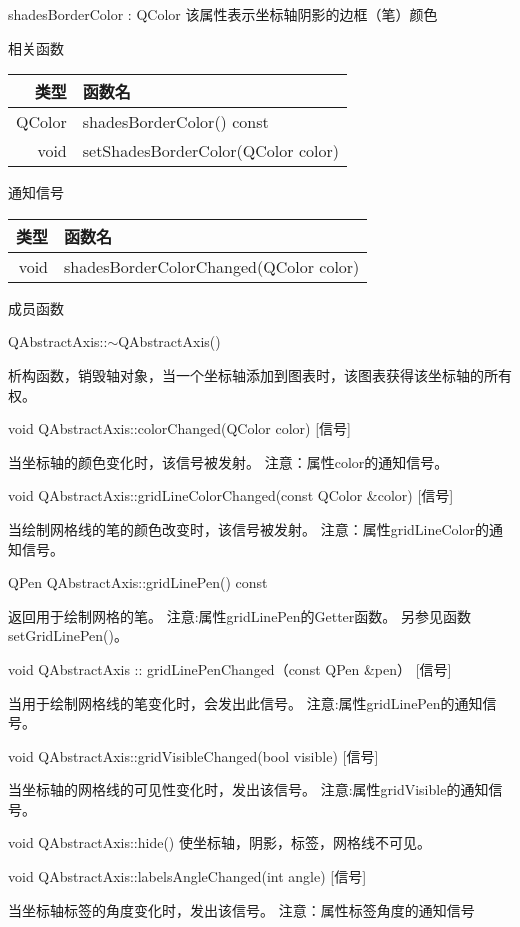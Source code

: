 shadesBorderColor : QColor 该属性表示坐标轴阴影的边框（笔）颜色

相关函数

\begin{tabular}{|r|l|}
\hline
类型&函数名\\ 
\hline
QColor	&shadesBorderColor() const\\
\hline
void&	setShadesBorderColor(QColor color)\\
\hline
\end{tabular}

通知信号

\begin{tabular}{|r|l|}
\hline
类型&函数名\\ 
\hline
void& shadesBorderColorChanged(QColor color)\\
\hline
\end{tabular}

\splitLine

成员函数

QAbstractAxis::$\sim$QAbstractAxis() 

析构函数，销毁轴对象，当一个坐标轴添加到图表时，该图表获得该坐标轴的所有权。

void QAbstractAxis::colorChanged(QColor color) [信号] 

当坐标轴的颜色变化时，该信号被发射。 注意：属性color的通知信号。

void QAbstractAxis::gridLineColorChanged(const QColor \&color) [信号] 

当绘制网格线的笔的颜色改变时，该信号被发射。 注意：属性gridLineColor的通知信号。

QPen QAbstractAxis::gridLinePen() const

 返回用于绘制网格的笔。 注意:属性gridLinePen的Getter函数。 另参见函数setGridLinePen()。

void QAbstractAxis :: gridLinePenChanged（const QPen \&pen） [信号] 

当用于绘制网格线的笔变化时，会发出此信号。 注意:属性gridLinePen的通知信号。

void QAbstractAxis::gridVisibleChanged(bool visible) [信号] 

当坐标轴的网格线的可见性变化时，发出该信号。 注意:属性gridVisible的通知信号。

void QAbstractAxis::hide() 使坐标轴，阴影，标签，网格线不可见。

void QAbstractAxis::labelsAngleChanged(int angle) [信号]

 当坐标轴标签的角度变化时，发出该信号。 注意：属性标签角度的通知信号

